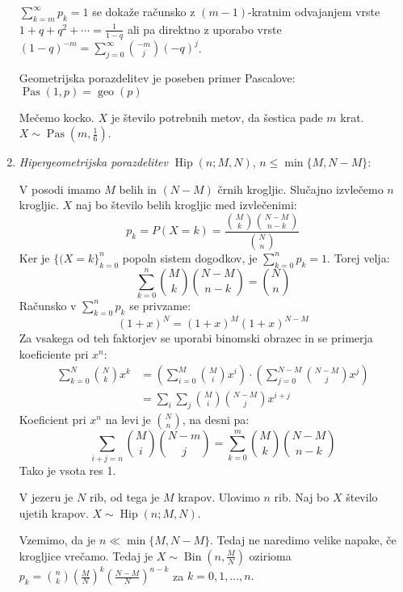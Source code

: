 \documentclass[12pt]{book}
\def\s{\vspace{10pt}}
\theoremstyle{definition}
\theoremstyle{plain}
\theoremstyle{plain}
\theoremstyle{plain}
\theoremstyle{remark}
\begin{document}
\begin{enumerate}
    $\sum_{k=m}^{\infty} p_k = 1$ se dokaže računsko z $(m-1)$-kratnim odvajanjem vrste $1+q+q^2+ \cdots = \frac{1}{1-q}$ ali pa direktno z uporabo vrste $(1-q)^{-m}=\sum_{j=0}^{\infty}\binom{-m}{j} (-q)^j$. \s
    
    Geometrijska porazdelitev je poseben primer Pascalove: $\operatorname{Pas}(1,p) = \operatorname{geo}(p)$

    \begin{zgled}
        Mečemo kocko. $X$ je število potrebnih metov, da šestica pade $m$ krat. $X \sim \operatorname{Pas}(m, \frac{1}{6})$.
    \end{zgled}

    \item \emph{Hipergeometrijska porazdelitev} $\operatorname{Hip}(n; M, N)$, $n \leq \min \{M, N-M\}$:
    
    V posodi imamo $M$ belih in $(N-M)$ črnih krogljic. Slučajno izvlečemo $n$ krogljic. $X$ naj bo število belih krogljic med izvlečenimi:
    $$
    p_k=P(X=k)=\frac{\binom{M}{k} \binom{N-M}{n-k}}{\binom{N}{n}}
    $$
    Ker je $\{(X=k\}_{k=0}^n$ popoln sistem dogodkov, je $\sum_{k=0}^n p_k=1$. Torej velja:
    $$
    \sum_{k=0}^{n} \binom{M}{k} \binom{N-M}{n-k} = \binom{N}{n}
    $$
    Računsko v $\sum_{k=0}^n p_k$ se privzame: 
    $$
    (1+x)^N=(1+x)^M(1+x)^{N-M}
    $$
    Za vsakega od teh faktorjev se uporabi binomski obrazec in se primerja koeficiente pri $x^n$:
    $$
    \begin{aligned}
        \sum_{k=0}^N \binom{N}{k} x^k&=\left(\sum_{i=0}^M \binom{M}{i} x^i\right) \cdot\left(\sum_{j=0}^{N-M} \binom{N-M}{j} x^j\right) \\
        &=\sum_i \sum_j \binom{M}{i}\binom{N-M}{j} x^{i+j}
    \end{aligned}
    $$
    Koeficient pri $x^n$ na levi je $\binom{N}{n}$, na desni pa: 
    $$
    \sum_{i+j=n}\binom{M}{i}\binom{N-m}{j}=\sum_{k=0}^m\binom{M}{k}\binom{N-M}{n-k}
    $$
    Tako je vsota res 1. 

    \begin{zgled}
        V jezeru je $N$ rib, od tega je $M$ krapov. Ulovimo $n$ rib. Naj bo $X$ število ujetih krapov. $X \sim \operatorname{Hip}(n;M,N)$.
    \end{zgled}

    Vzemimo, da je $n \ll \min\{M, N-M\}$. Tedaj ne naredimo velike napake, če krogljice vrečamo. Tedaj je $X \sim \operatorname{Bin}(n, \frac{M}{N})$ ozirioma $p_k = \binom{n}{k} \left(\frac{M}{N}\right)^k \left(\frac{N-M}{N}\right)^{n-k}$ za $k=0, 1, \ldots , n.$

\end{enumerate}
\end{document}
